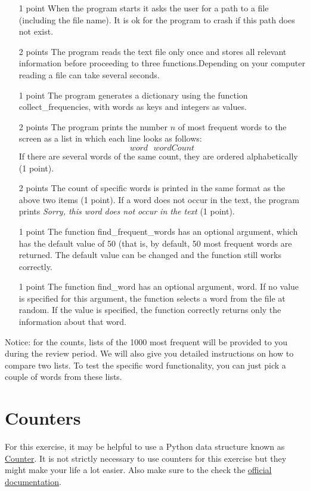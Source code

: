 \documentclass[11pt, a4paper]{article}
\begin{document}
\begin{itemize}
\item[1 point] When the program starts it asks the user for a path to a file (including the file name). It is ok for the program to crash if this path does not exist.
\item[2 points] The program reads the text file only once and stores all relevant information before proceeding to three functions.Depending on your computer reading a file can take several seconds.
\item[1 point] The program generates a dictionary using the function collect\_frequencies, with words as keys and integers as values.
\item[2 points] The program prints the number $n$ of most frequent words to the screen as a list in which each line looks as follows:
$$ word~~~wordCount $$
If there are several words of the same count, they are ordered alphabetically (1 point).
\item[2 points] The count of specific words is printed in the same format as the above two items (1 point). If a word does not occur in the text, the program prints \textit{Sorry, this
word does not occur in the text} (1 point).
\item[1 point] The function find\_frequent\_words has an optional argument, which has the default value of 50 (that is, by default, 50 most frequent words are returned. The default value can be changed and the function still works correctly.
\item[1 point] The function find\_word has an optional argument, word. If no value is specified for this argument, the function selects a word from the file at random. If the value is specified, the function correctly returns only the information about that word.
\end{itemize}

Notice: for the counts, lists of the 1000 most frequent will be provided to you during the review period. We will also give
you detailed instructions on how to compare two lists. To test the specific word functionality, you can just pick a couple of words from these lists.

\enlargethispage{1cm}
\section{Counters}
For this exercise, it may be helpful to use a Python data structure known as 
\href{https://pymotw.com/3/collections/counter.html}{Counter}. It is not strictly necessary to use counters
for this exercise but they might make your life a lot easier. Also make sure to the check the
\href{https://docs.python.org/3/library/collections.html#collections.Counter}{official documentation}.
\end{document}
